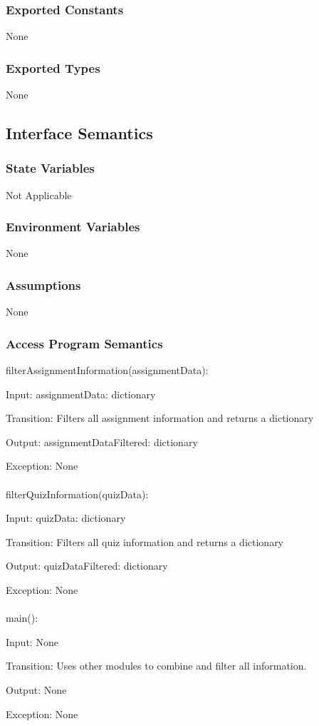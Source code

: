 \documentclass[12pt, titlepage]{article}
\begin{document}
\subsubsection{Exported Constants}
None
\subsubsection{Exported Types}
None
\subsection{Interface Semantics}
\subsubsection{State Variables}
Not Applicable
\subsubsection{Environment Variables}
None
\subsubsection{Assumptions}
None
\subsubsection{Access Program Semantics}
filterAssignmentInformation(assignmentData):
    
    Input: assignmentData: dictionary
    
    Transition: Filters all assignment information and returns a dictionary
    
    Output: assignmentDataFiltered: dictionary
    
    Exception: None
\\
\\
filterQuizInformation(quizData):

    Input: quizData: dictionary

    Transition: Filters all quiz information and returns a dictionary

    Output: quizDataFiltered: dictionary

    Exception: None
\\
\\
main():

    Input: None

    Transition: Uses other modules to combine and filter all information.

    Output: None

    Exception: None
\\
\\
\end{document}
